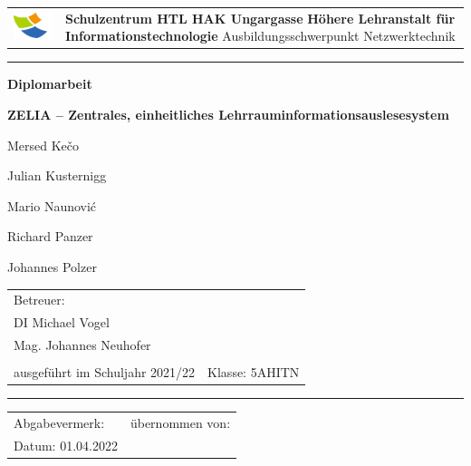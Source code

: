 
\begin{titlepage}
    \begin{tabular}{p{2.5cm}p{}}
        \vspace{0mm}
        \includegraphics[width=3cm]{media/szu_logo.png} &
        \centering
        {\Large \textbf{Schulzentrum HTL HAK Ungargasse} \vspace{5mm}} \newline
        \textbf{Höhere Lehranstalt für Informationstechnologie} \newline
        Ausbildungsschwerpunkt Netzwerktechnik 
        \end{tabular}
        \vspace{5mm}
        \hrule
    \begin{center}
    \vspace{15mm}
    \begin{huge}
        \textbf{Diplomarbeit}
        \vspace{8mm}

        \begin{onehalfspace}
            \textbf{ZELIA -- Zentrales, einheitliches Lehrraum\-informations\-auslesesystem}
        \end{onehalfspace}
    \end{huge}
    \vspace{1cm}
    \begin{large}
        Mersed Kečo

        Julian Kusternigg
        
        Mario Naunović
        
        Richard Panzer
        
        Johannes Polzer

    \end{large}
\end{center}
\vfill
\begin{tabular}{p{}l}
    Betreuer: & \\
    
    {\large DI Michael Vogel} & \\
    {\large Mag. Johannes Neuhofer} & \\\\
    ausgeführt im Schuljahr 2021/22 & Klasse: 5AHITN \\

\end{tabular}
\vspace{1cm}
\hrule
    \begin{tabular}{p{}l}
        
        Abgabevermerk: &übernommen von:\\     
        
        Datum: 01.04.2022 & 
    \end{tabular}
\end{titlepage}